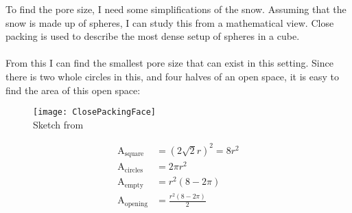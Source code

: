 To find the pore size, I need some simplifications of the snow. Assuming that the snow is made up of spheres, I can study this from a mathematical view. Close packing is used to describe the most dense setup of spheres in a cube.\\
\\
From this I can find the smallest pore size that can exist in this setting. Since there is two whole circles in this, and four halves of an open space, it is easy to find the area of this open space:
\\
\begin{figure}[ht]
	\begin{minipage}{.4\textwidth}
     \centering
        \texttt{[image: ClosePackingFace]}\\
     Sketch from \textcite{ClosePacking}
  \end{minipage}\quad
  \begin{minipage}[scale=0.8]{.4\textwidth}
    \begin{align}
        \text{A}_{\text{square}} &= (2\sqrt{2}r)^2 = 8r^2\\
        \text{A}_{\text{circles}} &= 2\pi r^2\\
        \text{A}_{\text{empty}} &= r^2(8-2\pi)\\
        \text{A}_{\text{opening}} &= \frac{r^2(8-2\pi)}{2}
    \end{align}
  \end{minipage}
\end{figure}

